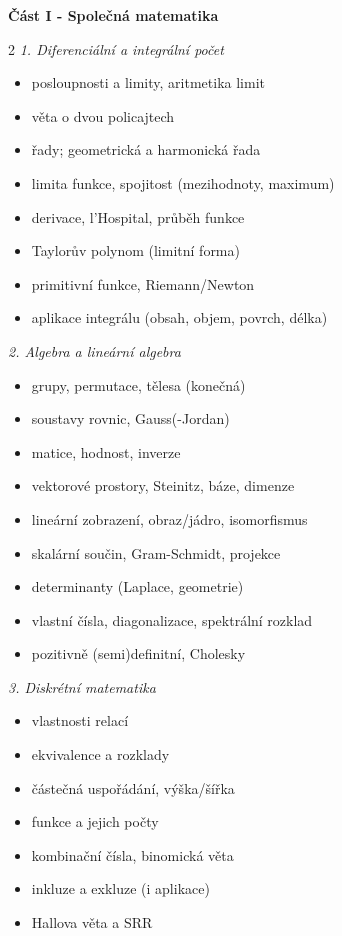\textbf{Část I - Společná matematika}
\begin{multicols}{2}\small
\textit{1. Diferenciální a integrální počet}
\begin{itemize}[label=\checkmark,leftmargin=1.3em,itemsep=0pt]
  \item posloupnosti a limity, aritmetika limit
  \item věta o dvou policajtech
  \item řady; geometrická a harmonická řada
  \item limita funkce, spojitost (mezihodnoty, maximum)
  \item derivace, l'Hospital, průběh funkce
  \item Taylorův polynom (limitní forma)
  \item primitivní funkce, Riemann/Newton
  \item aplikace integrálu (obsah, objem, povrch, délka)
\end{itemize}
\textit{2. Algebra a lineární algebra}
\begin{itemize}[label=\checkmark,leftmargin=1.3em,itemsep=0pt]
  \item grupy, permutace, tělesa (konečná)
  \item soustavy rovnic, Gauss(-Jordan)
  \item matice, hodnost, inverze
  \item vektorové prostory, Steinitz, báze, dimenze
  \item lineární zobrazení, obraz/jádro, isomorfismus
  \item skalární součin, Gram-Schmidt, projekce
  \item determinanty (Laplace, geometrie)
  \item vlastní čísla, diagonalizace, spektrální rozklad
  \item pozitivně (semi)definitní, Cholesky
\end{itemize}
\textit{3. Diskrétní matematika}
\begin{itemize}[label=\checkmark,leftmargin=1.3em,itemsep=0pt]
  \item vlastnosti relací
  \item ekvivalence a rozklady
  \item částečná uspořádání, výška/šířka
  \item funkce a jejich počty
  \item kombinační čísla, binomická věta
  \item inkluze a exkluze (i aplikace)
  \item Hallova věta a SRR

\end{itemize}
\end{multicols}
